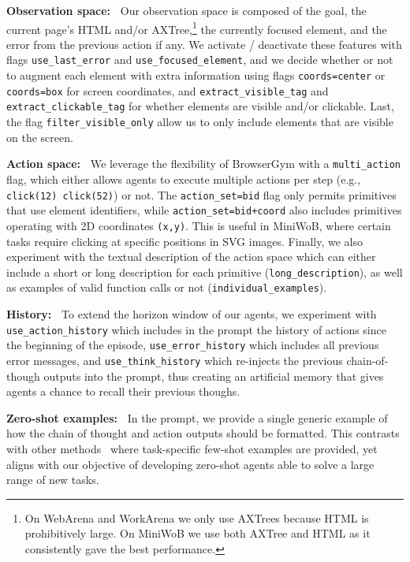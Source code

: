 \documentclass{article}
\theoremstyle{plain}
\theoremstyle{definition}
\theoremstyle{remark}
\newcommand{\paragraphtight}[1]{\textbf{#1~}}
\begin{document}
\paragraphtight{Observation space:} Our observation space is composed of the goal, the current page's HTML and/or AXTree,\footnote{On WebArena and WorkArena we only use AXTrees because HTML is prohibitively large. On MiniWoB we use both AXTree and HTML as it consistently gave the best performance.} the currently focused element, and the error from the previous action if any. We activate / deactivate these features with flags \texttt{use\_last\_error} and \texttt{use\_focused\_element}, and we decide whether or not to augment each element with extra information using flags \texttt{coords=center} or \texttt{coords=box} for screen coordinates, and \texttt{extract\_visible\_tag} and \texttt{extract\_clickable\_tag} for whether elements are visible and/or clickable. Last, the flag \texttt{filter\_visible\_only} allow us to only include elements that are visible on the screen.

\paragraphtight{Action space:} We leverage the flexibility of BrowserGym with a \texttt{multi\_action} flag, which either allows agents to execute multiple actions per step (e.g., \texttt{click(12) click(52)}) or not. The \texttt{action\_set=bid} flag only permits primitives that use element identifiers, while \texttt{action\_set=bid+coord} also includes primitives operating with 2D coordinates \texttt{(x,y)}. This is useful in MiniWoB, where certain tasks require clicking at specific positions in SVG images. Finally, we also experiment with the textual description of the action space which can either include a short or long description for each primitive (\texttt{long\_description}), as well as examples of valid function calls or not (\texttt{individual\_examples}).


\paragraphtight{History:} To extend the horizon window of our agents, we experiment with \texttt{use\_action\_history} which includes in the prompt the history of actions since the beginning of the episode, \texttt{use\_error\_history} which includes all previous error messages, and \texttt{use\_think\_history} which re-injects the previous chain-of-though outputs into the prompt, thus creating an artificial memory that gives agents a chance to recall their previous thoughs.

\paragraphtight{Zero-shot examples:} In the prompt, we provide a single generic example of how the chain of thought and action outputs should be formatted. This contrasts with other methods~\citep{kim2023rciagent} where task-specific few-shot examples are provided, yet aligns with our objective of developing zero-shot agents able to solve a large range of new tasks.
\end{document}
